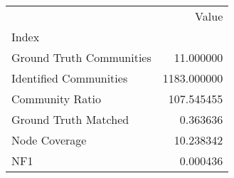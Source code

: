 \begin{tabular}{lr}
\toprule
{} &        Value \\
Index                    &              \\
\midrule
Ground Truth Communities &    11.000000 \\
Identified Communities   &  1183.000000 \\
Community Ratio          &   107.545455 \\
Ground Truth Matched     &     0.363636 \\
Node Coverage            &    10.238342 \\
NF1                      &     0.000436 \\
\bottomrule
\end{tabular}
